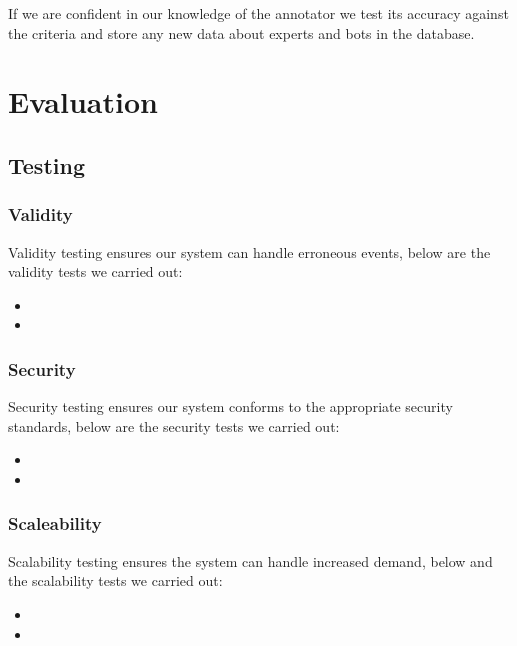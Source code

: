 \documentclass[11pt]{article}
\begin{document}
If we are confident in our knowledge of the annotator we test its accuracy against the criteria and store any new data about experts and bots in the database.\\


 
\section{Evaluation}
\subsection{Testing}
\subsubsection{Validity}
Validity testing ensures our system can handle erroneous events, below are the validity tests we carried out:
\begin{itemize}
\item
\item
\end{itemize}
\subsubsection{Security}
Security testing ensures our system conforms to the appropriate security standards, below are the security tests we carried out:
\begin{itemize}
\item
\item
\end{itemize}
\subsubsection{Scaleability}
Scalability testing ensures the system can handle increased demand, below and the scalability tests we carried out:
\begin{itemize}
\item
\item
\end{itemize}
\end{document}
